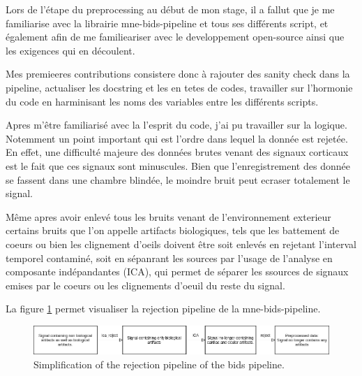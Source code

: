 Lors de l'étape du preprocessing au début de mon stage, il a fallut que je me familiarise avec la librairie mne-bids-pipeline et tous ses différents script, et également afin de me familieariser avec le developpement open-source ainsi que les exigences qui en découlent.

Mes premieeres contributions consistere donc à rajouter des sanity check dans la pipeline, actualiser les docstring et les en tetes de codes, travailler sur l'hormonie du code en harminisant les noms des variables entre les différents scripts.


Apres m'être familiarisé avec la l'esprit du code, j'ai pu travailler sur la logique. Notemment un point important qui est l'ordre dans lequel la donnée est rejetée. En effet, une difficulté majeure des données brutes venant des signaux corticaux est le fait que ces signaux sont minuscules. Bien que l'enregistrement des donnée se fassent dans une chambre blindée, le moindre bruit peut ecraser totalement le signal.

Même apres avoir enlevé tous les bruits venant de l'environnement exterieur certains bruits que l'on appelle artifacts biologiques, tels que les battement de coeurs ou bien les clignement d'oeils doivent être soit enlevés en rejetant l'interval temporel contaminé, soit en sépanrant les sources par l'usage de l'analyse en composante indépandantes (ICA), qui permet de séparer les ssources de signaux emises par le coeurs ou les clignements d'oeuil du reste du signal.

La figure \ref{rejection_pipeline} permet visualiser la rejection pipeline de la mne-bids-pipeline.

\begin{figure}[ht]
    \centering
    \includegraphics[width=15cm]{images_report/preprocessing/rejection_pipeline.png}
    \caption[Simplification of the rejection pipeline of the bids pipeline.]%
    {Simplification of the rejection pipeline of the bids pipeline.}
    \label{rejection_pipeline}
\end{figure}


